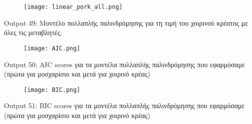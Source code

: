 \documentclass[10pt]{article}
\begin{document}
\begin{figure}[H]
    \centering
    \texttt{[image: linear\_pork\_all.png]}
    
    \label{fig:galaxy}
\end{figure}

\begin{centering}


\renewcommand{\caption}{Output 49: }
\caption {  Μοντέλο πολλαπλής παλινδρόμησης για τη τιμή του χοιρινού κρέατος με όλες τις μεταβλητές. }
\end{centering}

\begin{figure}[H]
    \centering
    \texttt{[image: AIC.png]}
    
    \label{fig:galaxy}
\end{figure}

\begin{centering}


\renewcommand{\caption}{Output 50: }
\caption { AIC scores για τα μοντέλα πολλαπλής παλινδρόμησης που εφαρμόσαμε (πρώτα για μοσχαρίσιο και μετά για χοιρινό κρέας) }
\end{centering}

\begin{figure}[H]
    \centering
    \texttt{[image: BIC.png]}
    
    \label{fig:galaxy}
\end{figure}

\begin{centering}


\renewcommand{\caption}{Output 51: }
\caption { BIC scores για τα μοντέλα πολλαπλής παλινδρόμησης που εφαρμόσαμε (πρώτα για μοσχαρίσιο και μετά για χοιρινό κρέας) }
\end{centering}
\end{document}
